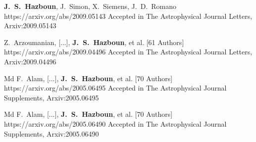          {\textbf{J.~S.~Hazboun}, J.~{Simon}, X.~{Siemens}, J.~D.~{Romano}}
         {https://arxiv.org/abs/2009.05143}
         {Accepted in {The Astrophysical Journal Letters}, {Arxiv:}2009.05143}

         {Z.~{Arzoumanian}, [...], \textbf{J.~S.~{Hazboun}}, et al. [61 Authors]}
         {https://arxiv.org/abs/2009.04496}
         {Accepted in {The Astrophysical Journal Letters}, {Arxiv:}2009.04496}

         {Md F.~{Alam}, [...], \textbf{J.~S.~{Hazboun}}, et al. [70 Authors]}
         {https://arxiv.org/abs/2005.06495}
         {Accepted in {The Astrophysical Journal Supplements}, {Arxiv:}2005.06495}

         {Md F.~{Alam}, [...], \textbf{J.~S.~{Hazboun}}, et al. [70 Authors]}
         {https://arxiv.org/abs/2005.06490}
         {Accepted in {The Astrophysical Journal Supplements}, {Arxiv:}2005.06490}

